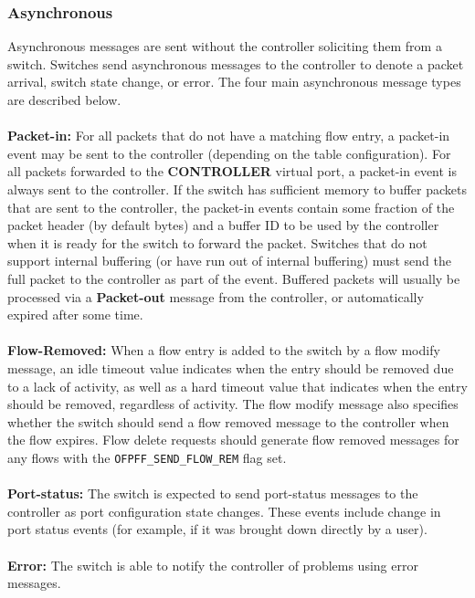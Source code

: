 \documentclass[10pt]{article}
\begin{document}
\subsubsection{Asynchronous}
\label{sec:asynchronous}
Asynchronous messages are sent without the controller soliciting them from a switch.  Switches send asynchronous messages to the controller to denote a packet arrival, switch state change, or error.  The four main asynchronous message types are described below.
\\\\
\textbf{Packet-in:} For all packets that do not have a matching flow entry, a packet-in event may be sent to the controller (depending on the table configuration). For all packets forwarded to the \textbf{CONTROLLER} virtual port, a packet-in event is always sent to the controller.  If the switch has sufficient memory to buffer packets that are sent to the controller, the packet-in events contain some fraction of the packet header (by default  bytes) and a buffer ID to be used by the controller when it is ready for the switch to forward the packet.  Switches that do not support internal buffering (or have run out of internal buffering) must send the full packet to the controller as part of the event. Buffered packets will usually be processed via a \textbf{Packet-out} message from the controller, or automatically expired after some time.
\\\\
\textbf{Flow-Removed:} When a flow entry is added to the switch by a flow modify message, an idle timeout value indicates when the entry should be removed due to a lack of activity, as well as a hard timeout value that indicates when the entry should be removed, regardless of activity.  The flow modify message also specifies whether the switch should send a flow removed message to the controller when the flow expires.  Flow delete requests should generate flow removed messages for any flows with the \verb|OFPFF_SEND_FLOW_REM| flag set.
\\\\
\textbf{Port-status:} The switch is expected to send port-status messages to the controller as port configuration state changes.  These events include change in port status events (for example, if it was brought down directly by a user).
\\\\
\textbf{Error:} The switch is able to notify the controller of problems using error messages. 
\end{document}
